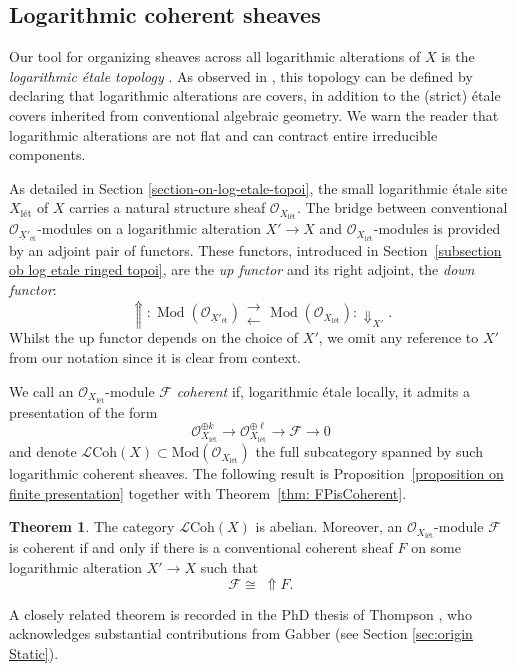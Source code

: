 \documentclass[11pt]{amsart}
\theoremstyle{definition}
\theoremstyle{definition}
\newtheorem{maintheorem}{Theorem}
\newcommand{\cL}{\mathcal{L}}
\newcommand{\LogO}[1]{\mathcal{O}_{{#1}_\text{l\'et}}}
\newcommand{\cal}{\mathcal}
\def\cL{{\cal L}}
\newcommand{\logcoh}[1]{\cL \text{Coh}(#1)}
\newcommand{\longleftrightarrows}{\mathrel{\substack{\textstyle\longrightarrow \\[-0.3ex] \textstyle\longleftarrow}}}
\begin{document}
\subsection{Logarithmic coherent sheaves}\label{section: log coh intro}

Our tool for organizing sheaves across all logarithmic alterations of $X$ is the \textit{logarithmic \'etale topology} \cite{m-type-topology,Overview-of-the-work-Kato-School,Log-etale-cohomology-Chikara-Nakayama}. As observed in \cite{MolchoWise,molcho2023remarks}, this topology can be defined by declaring that logarithmic alterations are covers, in addition to the (strict) \'etale covers inherited from conventional algebraic geometry. We warn the reader that logarithmic alterations are not flat and can contract entire irreducible components.

As detailed in Section \ref{section-on-log-etale-topoi}, the small logarithmic \'etale site $X_\text{l\'et}$ of $X$ carries a natural structure sheaf $\LogO{X}$. The bridge between conventional $\mathcal{O}_{\underline{X}{}'_\text{\'et}}$-modules on a logarithmic alteration $X'\rightarrow X$ and $\LogO{X}$-modules is provided by an adjoint pair of functors. These functors, introduced in Section~\ref{subsection ob log etale ringed topoi}, are the \textit{up functor} and its right adjoint, the \textit{down functor}:
$$\Uparrow\colon \operatorname{Mod}(\mathcal{O}_{\underline{X}{}'_\text{\'et}})\longleftrightarrows \operatorname{Mod}(\LogO{X})\colon \Downarrow_{X'}.$$
Whilst the up functor depends on the choice of $X'$, we omit any reference to $X'$ from our notation since it is clear from context. 

We call an $\LogO{X}$-module $\mathcal{F}$ \textit{coherent} if, logarithmic \'etale locally, it admits a presentation of the form
$$\LogO{X}^{\oplus k}\longrightarrow \LogO{X}^{\oplus \ell} \longrightarrow \mathcal{F} \longrightarrow 0$$ and denote $\logcoh{X}\subset \text{Mod}(\LogO{X})$ the full subcategory spanned by such logarithmic coherent sheaves. The following result is Proposition~\ref{proposition on finite presentation} together with Theorem~\ref{thm: FPisCoherent}.
\begin{maintheorem}\label{main theorem on log coherent}
    The category $\logcoh{X}$ is abelian. Moreover, an $\LogO{X}$-module $\mathcal{F}$ is coherent if and only if there is a conventional coherent sheaf $F$ on some logarithmic alteration $X'\rightarrow X$ such that $$\mathcal{F}\cong \;\Uparrow \! \! F.$$
\end{maintheorem}
A closely related theorem is recorded in the PhD thesis of Thompson \cite{on-toric-log-schemes}, who acknowledges substantial contributions from Gabber \cite{GabberToricFlattening} (see Section \ref{sec:origin Static}).
\end{document}
